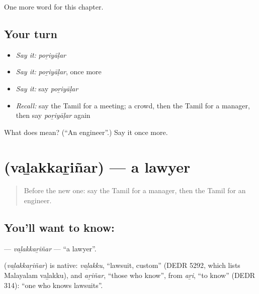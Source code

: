 \begin{grammarlens}[title={What you've built}]
One more word for this chapter.
\end{grammarlens}

\subsection*{Your turn}
\begin{itemize}
\raggedright
  \item \emph{Say it:} \emph{poṟiyāḷar}
  \item \emph{Say it:} \emph{poṟiyāḷar}, once more
  \item \emph{Say it:} say \emph{poṟiyāḷar}
  \item \emph{Recall:} say the Tamil for a meeting; a crowd, then the Tamil for a manager, then say \emph{poṟiyāḷar} again
\end{itemize}

\begin{tcolorbox}[breakable,colback=teal!4,colframe=teal!35!black,title={Before you move on}]
What does  mean? (\textquotedblleft{}An engineer\textquotedblright{}.) Say it once more.
\end{tcolorbox}
\section[\texorpdfstring{\ta{வழக்கறிஞர்} (vaḻakkaṟiñar)}{வழக்கறிஞர் (vaḻakkaṟiñar)}]{ (vaḻakkaṟiñar) — a lawyer}

\label{lesson:TA-C279-valakkarinar}



\begin{quote}
Before the new one: say the Tamil for a manager, then the Tamil for an engineer.
\end{quote}

\subsection*{You'll want to know: }
\textbf{} — \emph{vaḻakkaṟiñar} — \textquotedblleft{}a lawyer\textquotedblright{}.

\begin{cousinweb}
\textbf{} (\emph{vaḻakkaṟiñar}) is native: \emph{vaḻakku}, \textquotedblleft{}lawsuit, custom\textquotedblright{} (DEDR 5292, which lists Malayalam vaḻakku), and \emph{aṟiñar}, \textquotedblleft{}those who know\textquotedblright{}, from \emph{aṟi}, \textquotedblleft{}to know\textquotedblright{} (DEDR 314): \textquotedblleft{}one who knows lawsuits\textquotedblright{}.
\end{cousinweb}

